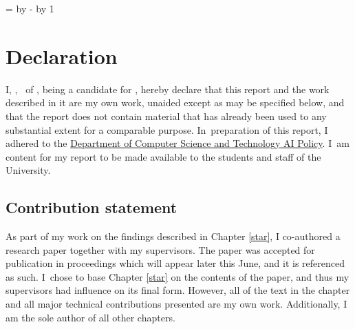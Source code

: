 \makeatletter
\@tempcnta=\relax%
\advance\@tempcnta by -%
\advance\@tempcnta by 1%
\xdef\contentpages{\the\@tempcnta}%
\makeatother

\begingroup
\onehalfspacing
\section*{Declaration}

I,
\makeatletter\ifanonymised
\candidate,
\else
\authorself{}\ of \college{},
\fi\makeatother
being a candidate for \coursefor{}, hereby declare that this report and
the work described in it are my own work, unaided except as may be
specified below, and that the report does not contain material that
has already been used to any substantial extent for a comparable
purpose.
In~preparation of this report, I adhered to the
\href{https://www.cst.cam.ac.uk/files/ai_policy.pdf}{Department of
Computer Science and Technology AI Policy}. I~am content for
my report to be made available to the students and staff of the
University.

\subsection*{Contribution statement}
As part of my work on the findings described in Chapter \ref{star}, I co-authored a research paper together with my supervisors. The paper was accepted for publication in proceedings which will appear later this June, and it is referenced as such. I~chose to base Chapter \ref{star} on the contents of the paper, and thus my supervisors had influence on its final form. However, all of the text in the chapter and all major technical contributions presented are my own work.
Additionally, I am the sole author of all other chapters.

